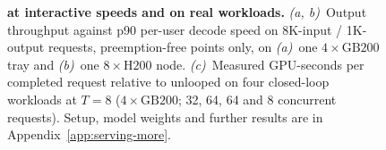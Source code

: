\begin{figure}[t]
\centering
{}
\caption{\textbf{\ourmethod at interactive speeds and on real workloads.}
\emph{(a, b)}~Output throughput against p90 per-user decode speed on 8K-input / 1K-output requests, preemption-free points only, on \emph{(a)}~one $4\times\text{GB200}$ tray and \emph{(b)}~one $8\times\text{H200}$ node.
\emph{(c)}~Measured GPU-seconds per completed request relative to unlooped \ced on four closed-loop workloads at $T=8$ ($4\times\text{GB200}$; 32, 64, 64 and 8 concurrent requests).
Setup, model weights and further results are in Appendix~\ref{app:serving-more}.}
\label{fig:serving-main}
\end{figure}
